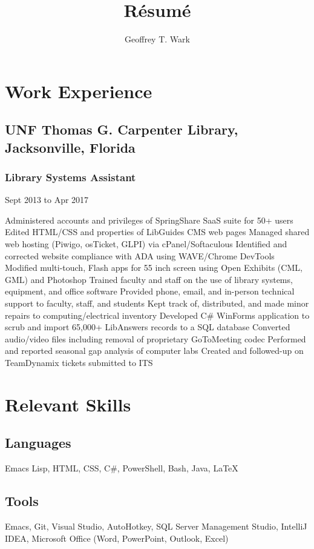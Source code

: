 \documentclass{article}
\begin{document}
\title{R\'esum\'e}
\author{Geoffrey T. Wark}

\maketitle


\section{Work Experience}
\subsection{UNF Thomas G. Carpenter Library, Jacksonville, Florida}
\subsubsection{Library Systems Assistant}
Sept 2013 to Apr 2017

Administered accounts and privileges of SpringShare SaaS suite for 50+ users
Edited HTML/CSS and properties of LibGuides CMS web pages
Managed shared web hosting (Piwigo, osTicket, GLPI) via cPanel/Softaculous
Identified and corrected website compliance with ADA using WAVE/Chrome DevTools
Modified multi-touch, Flash apps for 55 inch screen using Open Exhibits (CML, GML) and Photoshop
Trained faculty and staff on the use of library systems, equipment, and office software
Provided phone, email, and in-person technical support to faculty, staff, and students
Kept track of, distributed, and made minor repairs to computing/electrical inventory
Developed C\# WinForms application to scrub and import 65,000+ LibAnswers records to a SQL database
Converted audio/video files including removal of proprietary GoToMeeting codec
Performed and reported seasonal gap analysis of computer labs
Created and followed-up on TeamDynamix tickets submitted to ITS


\section{Relevant Skills}
\subsection{Languages}
Emacs Lisp, HTML, CSS, C\#, PowerShell, Bash, Java, {\LaTeX}

\subsection{Tools}
Emacs, Git, Visual Studio, AutoHotkey, SQL Server Management Studio, IntelliJ IDEA, Microsoft Office (Word, PowerPoint, Outlook, Excel)
\end{document}
